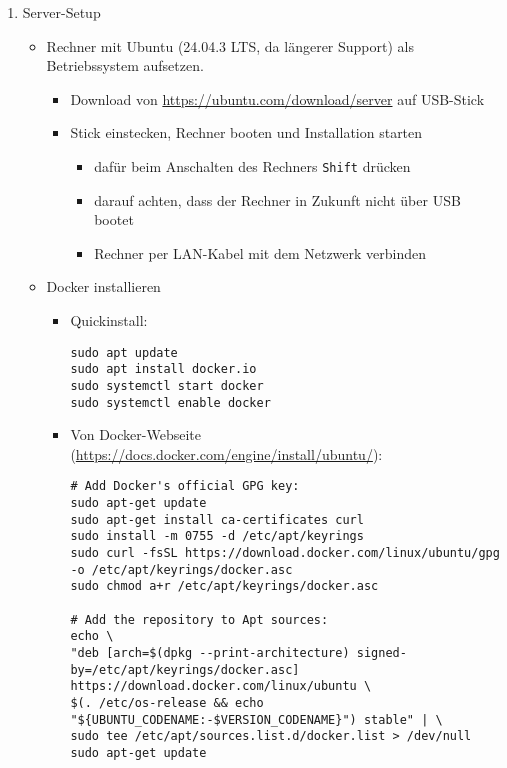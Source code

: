 \documentclass[12pt,a4paper]{report}
\begin{document}
\begin{enumerate}
  \item Server-Setup
    \begin{itemize}
      \item Rechner mit Ubuntu (24.04.3 LTS, da längerer Support) als Betriebssystem aufsetzen.
        \begin{itemize}
          \item Download von \url{https://ubuntu.com/download/server} auf USB-Stick
          \item Stick einstecken, Rechner booten und Installation starten
            \begin{itemize}
              \item dafür beim Anschalten des Rechners \texttt{Shift} drücken
              \item darauf achten, dass der Rechner in Zukunft nicht über USB bootet
              \item Rechner per LAN-Kabel mit dem Netzwerk verbinden
            \end{itemize}
        \end{itemize}

      \item Docker installieren
        \begin{itemize}
          \item Quickinstall:
          \begin{verbatim}
sudo apt update
sudo apt install docker.io
sudo systemctl start docker
sudo systemctl enable docker
          \end{verbatim}

          \item Von Docker-Webseite (\url{https://docs.docker.com/engine/install/ubuntu/}):
          \begin{verbatim}
# Add Docker's official GPG key:
sudo apt-get update
sudo apt-get install ca-certificates curl
sudo install -m 0755 -d /etc/apt/keyrings
sudo curl -fsSL https://download.docker.com/linux/ubuntu/gpg -o /etc/apt/keyrings/docker.asc
sudo chmod a+r /etc/apt/keyrings/docker.asc

# Add the repository to Apt sources:
echo \
"deb [arch=$(dpkg --print-architecture) signed-by=/etc/apt/keyrings/docker.asc] https://download.docker.com/linux/ubuntu \
$(. /etc/os-release && echo "${UBUNTU_CODENAME:-$VERSION_CODENAME}") stable" | \
sudo tee /etc/apt/sources.list.d/docker.list > /dev/null
sudo apt-get update
          \end{verbatim}


\end{itemize}
\end{itemize}
\end{enumerate}
\end{document}
